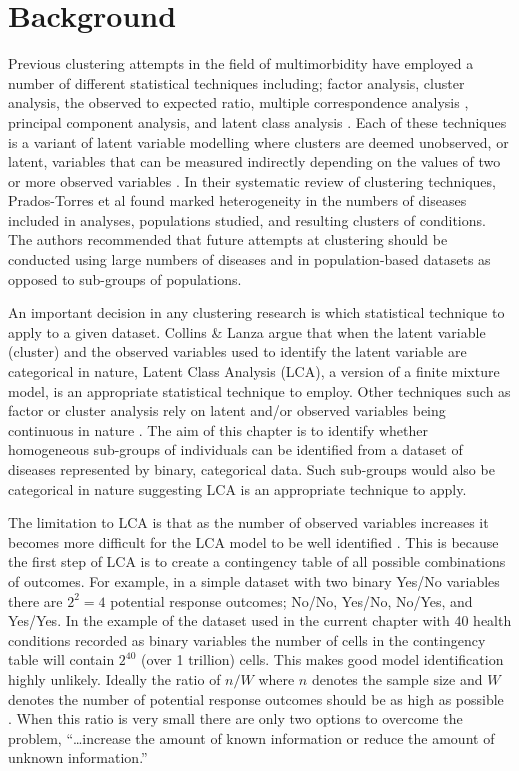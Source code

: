 \documentclass[12pt,]{report}
\begin{document}
\section{Background}\label{sec:clust-background}

Previous clustering attempts in the field of multimorbidity have
employed a number of different statistical techniques including; factor
analysis, cluster analysis, the observed to expected ratio, multiple
correspondence analysis \citep{RN98}, principal component analysis, and
latent class analysis \citep{RN109}. Each of these techniques is a
variant of latent variable modelling where clusters are deemed
unobserved, or latent, variables that can be measured indirectly
depending on the values of two or more observed variables \citep{RN291}.
In their systematic review of clustering techniques, Prados-Torres et al
\citeyearpar{RN98} found marked heterogeneity in the numbers of diseases
included in analyses, populations studied, and resulting clusters of
conditions. The authors recommended that future attempts at clustering
should be conducted using large numbers of diseases and in
population-based datasets as opposed to sub-groups of populations.

An important decision in any clustering research is which statistical
technique to apply to a given dataset. Collins \& Lanza
\citeyearpar{RN291} argue that when the latent variable (cluster) and
the observed variables used to identify the latent variable are
categorical in nature, Latent Class Analysis (LCA), a version of a
finite mixture model, is an appropriate statistical technique to employ.
Other techniques such as factor or cluster analysis rely on latent
and/or observed variables being continuous in nature \citep{RN291}. The
aim of this chapter is to identify whether homogeneous sub-groups of
individuals can be identified from a dataset of diseases represented by
binary, categorical data. Such sub-groups would also be categorical in
nature suggesting LCA is an appropriate technique to apply.

The limitation to LCA is that as the number of observed variables
increases it becomes more difficult for the LCA model to be well
identified \citep{RN291}. This is because the first step of LCA is to
create a contingency table of all possible combinations of outcomes. For
example, in a simple dataset with two binary Yes/No variables there are
\(2^{2} = 4\) potential response outcomes; No/No, Yes/No, No/Yes, and
Yes/Yes. In the example of the dataset used in the current chapter with
40 health conditions recorded as binary variables the number of cells in
the contingency table will contain \(2^{40}\) (over 1 trillion) cells.
This makes good model identification highly unlikely. Ideally the ratio
of \(n/W\) where \(n\) denotes the sample size and \(W\) denotes the
number of potential response outcomes should be as high as possible
\citep{RN291}. When this ratio is very small there are only two options
to overcome the problem, ``\ldots{}increase the amount of known
information or reduce the amount of unknown information.'' \citep[
:93]{RN291}
\end{document}

